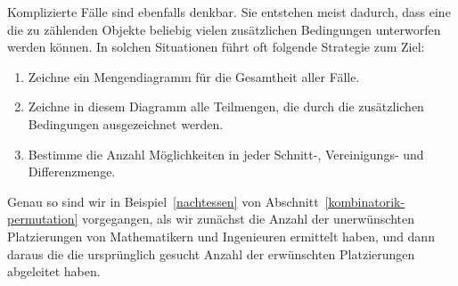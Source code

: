 Komplizierte Fälle sind ebenfalls denkbar.
Sie entstehen meist dadurch, 
dass eine die zu zählenden Objekte beliebig vielen zusätzlichen
Bedingungen unterworfen werden können.
In solchen Situationen
führt oft folgende Strategie zum Ziel:
\begin{enumerate}
\item Zeichne ein Mengendiagramm für die Gesamtheit aller Fälle.
\item Zeichne in diesem Diagramm alle Teilmengen, die durch 
die zusätzlichen Bedingungen ausgezeichnet werden.
\item Bestimme die Anzahl Möglichkeiten in jeder Schnitt-, Vereinigungs-
und Differenzmenge.
\end{enumerate}
Genau so sind wir in Beispiel~\ref{nachtessen} von
Abschnitt~\ref{kombinatorik-permutation} vorgegangen,
als wir zunächst die Anzahl der unerwünschten Platzierungen
von Mathematikern und Ingenieuren ermittelt haben, und dann daraus
die die ursprünglich gesucht Anzahl der erwünschten Platzierungen
abgeleitet haben.

